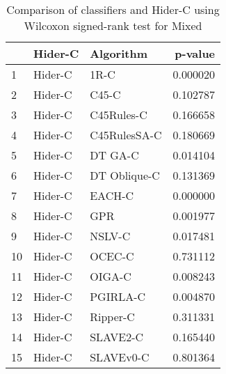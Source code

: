 \begin{table}
\footnotesize
\caption{Comparison of classifiers and Hider-C using Wilcoxon signed-rank test for Mixed}
\label{tab:Hider-C wilcoxon Mixed comparison}
\begin{tabular}{lllr}
\hline
 & Hider-C & Algorithm & p-value \\
\hline
1 & Hider-C & 1R-C & 0.000020 \\
2 & Hider-C & C45-C & 0.102787 \\
3 & Hider-C & C45Rules-C & 0.166658 \\
4 & Hider-C & C45RulesSA-C & 0.180669 \\
5 & Hider-C & DT GA-C & 0.014104 \\
6 & Hider-C & DT Oblique-C & 0.131369 \\
7 & Hider-C & EACH-C & 0.000000 \\
8 & Hider-C & GPR & 0.001977 \\
9 & Hider-C & NSLV-C & 0.017481 \\
10 & Hider-C & OCEC-C & 0.731112 \\
11 & Hider-C & OIGA-C & 0.008243 \\
12 & Hider-C & PGIRLA-C & 0.004870 \\
13 & Hider-C & Ripper-C & 0.311331 \\
14 & Hider-C & SLAVE2-C & 0.165440 \\
15 & Hider-C & SLAVEv0-C & 0.801364 \\
\hline
\end{tabular}
\end{table}
